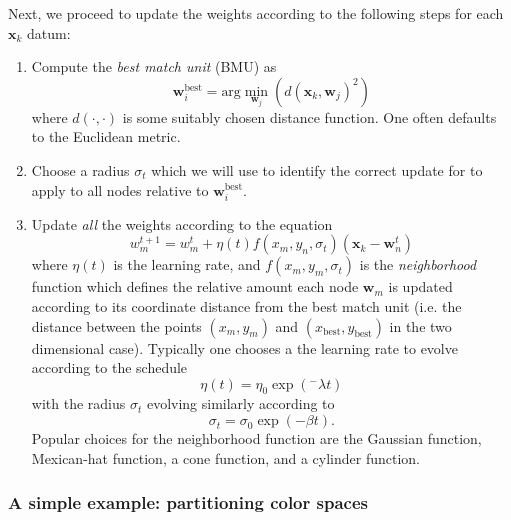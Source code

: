 Next, we proceed to update the weights according to the following steps for each $\mathbf{x}_k$ datum:
\begin{enumerate}
\item Compute the \textit{best match unit} (BMU) as
  \begin{equation}
    \mathbf{w}_{i}^{\text{best}} = \text{arg}\min\limits_{\mathbf{w}_j} \left( d(\mathbf{x}_k, \mathbf{w}_j)^2 \right)
  \end{equation}
  where $d(\cdot,\cdot)$ is some suitably chosen distance function. One often defaults to the Euclidean metric.
\item Choose a radius $\sigma_t$ which we will use to identify the correct update for to apply to all nodes relative to $\mathbf{w}_i^{\text{best}}$.
\item Update \textit{all} the weights according to the equation
  \begin{equation}
    w_{m}^{t+1} = w_m^{t} + \eta(t)f(x_m,y_n,\sigma_t)\left(\mathbf{x}_k  - \mathbf{w}_n^{t} \right)
  \end{equation}
  where $\eta(t)$ is the learning rate, and $f(x_m, y_m, \sigma_t)$ is the \textit{neighborhood} function which defines the relative amount each node $\mathbf{w}_m$ is updated according to its coordinate distance from the best match unit (i.e. the distance between the points $(x_m, y_m)$ and $(x_{\text{best}}, y_{\text{best}})$ in the two dimensional case). Typically one chooses a the learning rate to evolve according to the schedule
  \begin{equation}
    \eta(t) = \eta_0\exp(^-\lambda t)
  \end{equation}
  with the radius $\sigma_t$ evolving similarly according to
  \begin{equation}
    \sigma_t = \sigma_0\exp(-\beta t).
  \end{equation}
  Popular choices for the neighborhood function are the Gaussian function, Mexican-hat function, a cone function, and a cylinder function.
\end{enumerate}

\subsubsection{A simple example: partitioning color spaces}

